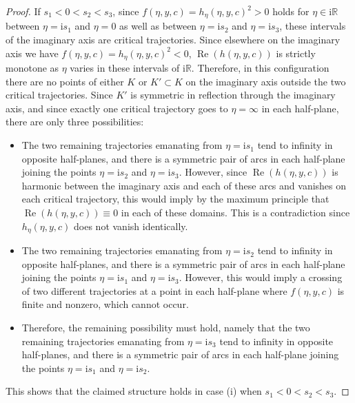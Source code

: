 \documentclass[11pt]{article}
\numberwithin{equation}{section}
\numberwithin{equation}{section}
\begin{document}
\begin{proof}
If $s_1<0<s_2<s_3$, since $f(\eta,y,c)=h_\eta(\eta,y,c)^2>0$ holds for $\eta\in\mathrm{i}\mathbb{R}$ between $\eta=\mathrm{i} s_1$ and $\eta=0$ as well as between $\eta=\mathrm{i} s_2$ and $\eta=\mathrm{i} s_3$, these intervals of the imaginary axis are critical trajectories. Since elsewhere on the imaginary axis we have ${f(\eta,y,c)=h_\eta(\eta,y,c)^2<0}$, $\operatorname{Re}(h(\eta,y,c))$ is strictly monotone as $\eta$ varies in these intervals of $\mathrm{i}\mathbb{R}$. Therefore, in this configuration there are no points of either $K$ or $K'\subset K$ on the imaginary axis outside the two critical trajectories. Since $K'$ is symmetric in reflection through the imaginary axis, and since exactly one critical trajectory goes to $\eta=\infty$ in each half-plane, there are only three possibilities:
\begin{itemize}\itemsep=0pt
\item The two remaining trajectories emanating from $\eta=\mathrm{i} s_1$ tend to infinity in opposite half-planes, and there is a symmetric pair of arcs in each half-plane joining the points $\eta=\mathrm{i} s_2$ and $\eta=\mathrm{i} s_3$. However, since $\operatorname{Re}(h(\eta,y,c))$ is harmonic between the imaginary axis and each of these arcs and vanishes on each critical trajectory, this would imply by the maximum principle that $\operatorname{Re}(h(\eta,y,c))\equiv 0$ in each of these domains. This is a contradiction since $h_\eta(\eta,y,c)$ does not vanish identically.
\item The two remaining trajectories emanating from $\eta=\mathrm{i} s_2$ tend to infinity in opposite half-planes, and there is a symmetric pair of arcs in each half-plane joining the points $\eta=\mathrm{i} s_1$ and $\eta=\mathrm{i} s_3$. However, this would imply a crossing of two different trajectories at a point in each half-plane where $f(\eta,y,c)$ is finite and nonzero, which cannot occur.
\item Therefore, the remaining possibility must hold, namely that the two remaining trajectories emanating from $\eta=\mathrm{i} s_3$ tend to infinity in opposite half-planes, and there is a symmetric pair of arcs in each half-plane joining the points $\eta=\mathrm{i} s_1$ and $\eta=\mathrm{i} s_2$.
\end{itemize}
This shows that the claimed structure holds in case (i) when $s_1<0<s_2<s_3$.


\end{proof}
\end{document}
